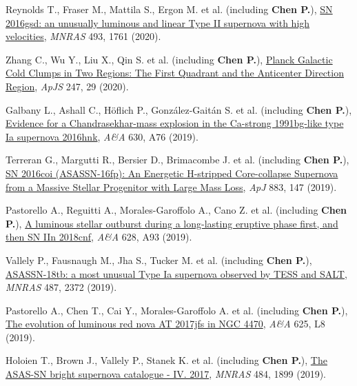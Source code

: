 \item Reynolds T., Fraser M., Mattila S., Ergon M. et al. (including \textbf{Chen P.}), \href{https://ui.adsabs.harvard.edu/abs/2020MNRAS.493.1761R}{SN 2016gsd: an unusually luminous and linear Type II supernova with high velocities}, \textit{MNRAS} 493, 1761 (2020).

\item Zhang C., Wu Y., Liu X., Qin S. et al. (including \textbf{Chen P.}), \href{https://ui.adsabs.harvard.edu/abs/2020ApJS..247...29Z}{Planck Galactic Cold Clumps in Two Regions: The First Quadrant and the Anticenter Direction Region}, \textit{ApJS} 247, 29 (2020).

\item Galbany L., Ashall C., H{\"o}flich P., Gonz{\'a}lez-Gait{\'a}n S. et al. (including \textbf{Chen P.}), \href{https://ui.adsabs.harvard.edu/abs/2019A&A...630A..76G}{Evidence for a Chandrasekhar-mass explosion in the Ca-strong 1991bg-like type Ia supernova 2016hnk}, \textit{A\&A} 630, A76 (2019).

\item Terreran G., Margutti R., Bersier D., Brimacombe J. et al. (including \textbf{Chen P.}), \href{https://ui.adsabs.harvard.edu/abs/2019ApJ...883..147T}{SN 2016coi (ASASSN-16fp): An Energetic H-stripped Core-collapse Supernova from a Massive Stellar Progenitor with Large Mass Loss}, \textit{ApJ} 883, 147 (2019).

\item Pastorello A., Reguitti A., Morales-Garoffolo A., Cano Z. et al. (including \textbf{Chen P.}), \href{https://ui.adsabs.harvard.edu/abs/2019A&A...628A..93P}{A luminous stellar outburst during a long-lasting eruptive phase first, and then SN IIn 2018cnf}, \textit{A\&A} 628, A93 (2019).

\item Vallely P., Fausnaugh M., Jha S., Tucker M. et al. (including \textbf{Chen P.}), \href{https://ui.adsabs.harvard.edu/abs/2019MNRAS.487.2372V}{ASASSN-18tb: a most unusual Type Ia supernova observed by TESS and SALT}, \textit{MNRAS} 487, 2372 (2019).

\item Pastorello A., Chen T., Cai Y., Morales-Garoffolo A. et al. (including \textbf{Chen P.}), \href{https://ui.adsabs.harvard.edu/abs/2019A&A...625L...8P}{The evolution of luminous red nova AT 2017jfs in NGC 4470}, \textit{A\&A} 625, L8 (2019).

\item Holoien T., Brown J., Vallely P., Stanek K. et al. (including \textbf{Chen P.}), \href{https://ui.adsabs.harvard.edu/abs/2019MNRAS.484.1899H}{The ASAS-SN bright supernova catalogue - IV. 2017}, \textit{MNRAS} 484, 1899 (2019).

